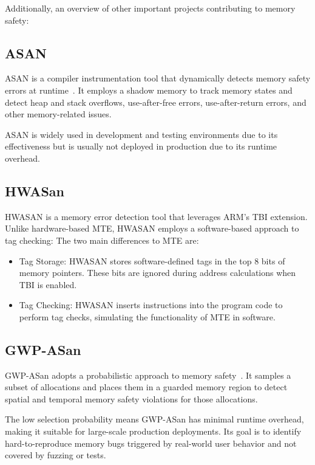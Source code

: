 Additionally, an overview of other important projects contributing to memory safety:

\subsection{ASAN}
\label{subsec:related-asan}

\Acl{ASAN} is a compiler instrumentation tool that dynamically detects memory safety errors at runtime~\cite{serebryany2012addresssanitizer}.
It employs a shadow memory to track memory states and detect heap and stack overflows, use-after-free errors, use-after-return errors, and other memory-related issues.

\Ac{ASAN} is widely used in development and testing environments due to its effectiveness but is usually not deployed in production due to its runtime overhead.

\subsection{HWASan}
\label{subsec:hwasan}

\Acl{HWASAN} is a memory error detection tool that leverages ARM's \ac{TBI} extension.
Unlike hardware-based \ac{MTE}, \ac{HWASAN} employs a software-based approach to tag checking:
The two main differences to \ac{MTE} are:
\begin{itemize}
    \item Tag Storage: \ac{HWASAN} stores software-defined tags in the top 8 bits of memory pointers.
    These bits are ignored during address calculations when TBI is enabled.
    \item Tag Checking: \ac{HWASAN} inserts instructions into the program code to perform tag checks, simulating the functionality of \ac{MTE} in software.
\end{itemize}

\subsection{GWP-ASan}
\label{subsec:gwp-asan}

GWP-ASan adopts a probabilistic approach to memory safety~\cite{serebryany2023gwp}.
It samples a subset of allocations and places them in a guarded memory region to detect spatial and temporal memory safety violations for those allocations.

The low selection probability means GWP-ASan has minimal runtime overhead, making it suitable for large-scale production deployments.
Its goal is to identify hard-to-reproduce memory bugs triggered by real-world user behavior and not covered by fuzzing or tests.
